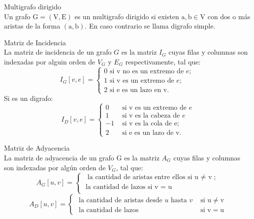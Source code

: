 \documentclass{article}
\begin{document}
\begin{defn}
Multigrafo dirigido \\ Un grafo $\mathrm{G}=(\mathrm{V}, \mathrm{E})$ es un multigrafo dirigido si existen $\mathrm{a}, \mathrm{b} \in \mathrm{V}$ con dos o más aristas de la forma $(\mathrm{a}, \mathrm{b})$. En caso contrario se llama digrafo simple.
\end{defn}

\begin{defn}
Matriz de Incidencia \\ La matriz de incidencia de un grafo $G$ es la matriz $I_{G}$ cuyas filas y columnas son indexadas por alguin orden de $V_{G}$ y $E_{G}$ respectivamente, tal que:
$$I_{G}[v, e]=\left\{\begin{array}{l}0 \text { si v no es un extremo de } e \text {; } \\ 1 \text { si v es un extremo de } e \text {; } \\ 2 \text { si e es un lazo en v. }\end{array}\right.$$ Si es un digrafo:
$$I_{D}[v, e]=\left\{\begin{array}{ll}0 & \text { si } \mathrm{v} \text { es un extremo de } e \\ 1 & \text { si } \mathrm{v} \text { es la cabeza de } e \\ -1 & \text { si } \mathrm{v} \text { es la cola de } \mathrm{e} ; \\ 2 & \text { si e es un lazo de } \mathrm{v} .\end{array}\right.$$
\end{defn}

\begin{defn}
Matriz de Adyacencia \\ La matriz de adyacencia de un grafo $\mathrm{G}$ es la matriz $A_{G}$ cuyas filas y columnas son indexadas por algún orden de $V_{G}$, tal que:
$$A_{G}[u, v]=\left\{\begin{array}{l}\text { la cantidad de aristas entre ellos si u $\neq$ v} ; \\ \text { la cantidad de lazos si v = u} \\ \end{array}\right.$$
$$A_{D}[u, v]=\left\{\begin{array}{ll}\text { la cantidad de aristas desde } u \text { hasta } v & \text { si } \mathrm{u} \neq \mathrm{v} \\ \text { la cantidad de lazos } & \text { si } \mathrm{v}=\mathrm{u}\end{array}\right.$$
\end{defn}
\end{document}
